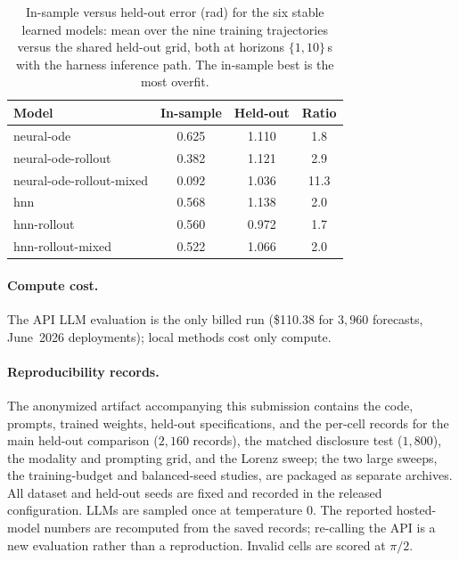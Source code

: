 \documentclass{article}
\begin{document}
\begin{table}[tbp]
\centering\small
\caption{In-sample versus held-out error (rad) for the six stable learned models: mean over
the nine training trajectories versus the shared held-out grid, both at horizons
$\{1,10\}$\,s with the harness inference path. The in-sample best is the most overfit.}
\label{tab:insample}
\begin{tabular}{lccc}
\toprule
Model & In-sample & Held-out & Ratio \\
\midrule
neural-ode & 0.625 & 1.110 & 1.8 \\
neural-ode-rollout & 0.382 & 1.121 & 2.9 \\
neural-ode-rollout-mixed & 0.092 & 1.036 & 11.3 \\
hnn & 0.568 & 1.138 & 2.0 \\
hnn-rollout & 0.560 & 0.972 & 1.7 \\
hnn-rollout-mixed & 0.522 & 1.066 & 2.0 \\
\bottomrule
\end{tabular}
\end{table}

\paragraph{Compute cost.} The API LLM evaluation is the only billed run (\$110.38 for
$3{,}960$ forecasts, June~2026 deployments); local methods cost only compute.

\paragraph{Reproducibility records.} The anonymized artifact accompanying this submission
contains the code, prompts, trained weights, held-out specifications, and the per-cell
records for the main held-out comparison ($2{,}160$ records), the matched disclosure test
($1{,}800$), the modality and prompting grid, and the Lorenz sweep; the two large sweeps, the
training-budget and balanced-seed studies, are packaged as separate archives. All dataset and
held-out seeds are fixed and recorded in the released configuration. LLMs are sampled once at
temperature 0. The reported hosted-model numbers are recomputed from the saved records; re-calling
the API is a new evaluation rather than a reproduction. Invalid cells are scored at $\pi/2$.
\end{document}
